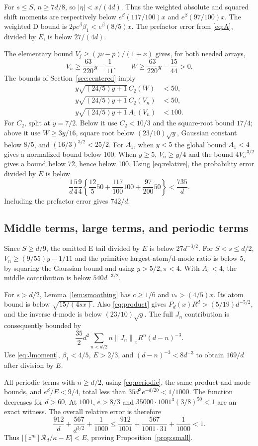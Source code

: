 \documentclass[11pt]{article}
\theoremstyle{remark}\newtheorem{remark}[theorem]{Remark}
\newcommand{\Rpoly}{\mathcal R}
\newcommand{\norm}[1]{\left\|#1\right\|_x}
\begin{document}
For $s\le S$, $n\ge7d/8$, so $|\eta|<x/(4d)$. Thus the weighted absolute
and squared shift moments are respectively below
$e^\beta(117/100)x$ and $e^\beta(97/100)x$.
The weighted D bound is $2pe^\beta\beta_1<e^\beta(8/5)x$.
The prefactor error from \eqref{eq:A}, divided by $E$, is below $27/(4d)$.

The elementary bound $V_j\ge(j\nu-p)/(1+x)$ gives, for both needed arrays,
\[
 V_n\ge\frac{63}{220}y-\frac1{11},\qquad
 W\ge\frac{63}{220}y-\frac{15}{44}>0.
\]
The bounds of Section~\ref{sec:centered} imply
\begin{align}
 y\sqrt{(24/5)y+1}\,C_2(W)&<50,\\
 y\sqrt{(24/5)y+1}\,C_2(V_n)&<50,\\
 y\sqrt{(24/5)y+1}\,A_1(V_n)&<100.
\end{align}
For $C_2$, split at $y=7/2$. Below it use $C_2<10/3$ and the square-root
bound $17/4$; above it use $W\ge3y/16$, square root below
$(23/10)\sqrt y$, Gaussian constant below $8/5$, and
$(16/3)^{3/2}<25/2$.
For $A_1$, when $y<5$ the global bound $A_1<4$ gives a normalized bound
below 100. When $y\ge5$, $V_n\ge y/4$ and the bound $4V_n^{-3/2}$
gives a bound below 72, hence below 100.
Using \eqref{eq:relative}, the probability error divided by $E$ is below
\[
 \frac1d\frac54\frac94
 \left\{\frac{12}{5}50+\frac{117}{100}100+\frac{97}{200}50\right\}
 <\frac{735}{d}.
\]
Including the prefactor error gives $742/d$.

\subsection{Middle terms, large terms, and periodic terms}
Since $S\ge d/9$, the omitted E tail divided by $E$ is below
$27d^{-3/2}$. For $S<s\le d/2$,
$V_n\ge(9/55)y-1/11$ and the primitive largest-atom/d-mode ratio is below
5, by squaring the Gaussian bound and using $y>5/2,\pi<4$.
With $A_s<4$, the middle contribution is below $540d^{-3/2}$.

For $s>d/2$, Lemma~\ref{lem:smoothing} has $c\ge1/6$ and $v_*>(4/5)x$.
Its atom bound is below $\sqrt{15/(4sx)}$.
Also \eqref{eq:product} gives $P_d(x)R^d>(5/19)d^{-5/2}$, and the inverse
d-mode is below $(23/10)\sqrt y$.
The full $J_n$ contribution is consequently bounded by
\[
 \frac{35}{2}d^2\sum_{n<d/2}n\norm{J_n}R^n(d-n)^{-3}.
\]
Use \eqref{eq:Jmoment}, $\beta_1<4/5$, $E>2/3$, and
$(d-n)^{-3}<8d^{-3}$ to obtain $169/d$ after division by $E$.

All periodic terms with $n\ge d/2$, using \eqref{eq:periodic}, the same
product and mode bounds, and $e^\beta/E<9/4$, total less than
$35d^3e^{-d/20}<1/1000$. The function decreases for $d>60$.
At $1001$, $e>8/3$ and
$35000\cdot1001^3(3/8)^{50}<1$ are an exact witness.
The overall relative error is therefore
\[
 \frac{912}{d}+\frac{567}{d^{3/2}}+\frac1{1000}
 \le\frac{912}{1001}+\frac{567}{1001\cdot31}+\frac1{1000}<1.
\]
Thus $|[z^m]\Rpoly_d/\kappa-E|<E$, proving Proposition~\ref{prop:small}.
\end{document}
